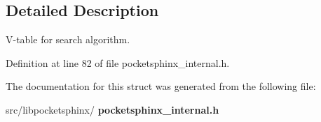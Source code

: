 \subsection{Detailed Description}
V-\/table for search algorithm. 

Definition at line 82 of file pocketsphinx\+\_\+internal.\+h.



The documentation for this struct was generated from the following file\+:\begin{DoxyCompactItemize}
\item 
src/libpocketsphinx/\textbf{ pocketsphinx\+\_\+internal.\+h}\end{DoxyCompactItemize}
